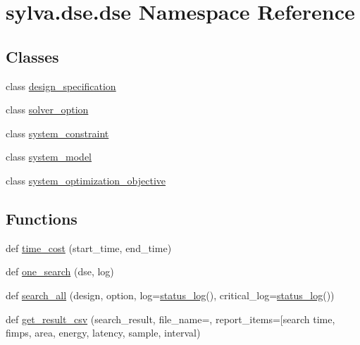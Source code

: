 \hypertarget{namespacesylva_1_1dse_1_1dse}{}\section{sylva.\+dse.\+dse Namespace Reference}
\label{namespacesylva_1_1dse_1_1dse}
\subsection*{Classes}
\begin{DoxyCompactItemize}
\item 
class \hyperlink{classsylva_1_1dse_1_1dse_1_1design__specification}{design\+\_\+specification}
\item 
class \hyperlink{classsylva_1_1dse_1_1dse_1_1solver__option}{solver\+\_\+option}
\item 
class \hyperlink{classsylva_1_1dse_1_1dse_1_1system__constraint}{system\+\_\+constraint}
\item 
class \hyperlink{classsylva_1_1dse_1_1dse_1_1system__model}{system\+\_\+model}
\item 
class \hyperlink{classsylva_1_1dse_1_1dse_1_1system__optimization__objective}{system\+\_\+optimization\+\_\+objective}
\end{DoxyCompactItemize}
\subsection*{Functions}
\begin{DoxyCompactItemize}
\item 
def \hyperlink{namespacesylva_1_1dse_1_1dse_acf83688e18cc0859483b4c9bb70183fd}{time\+\_\+cost} (start\+\_\+time, end\+\_\+time)
\item 
def \hyperlink{namespacesylva_1_1dse_1_1dse_a27653b05dda8ab9dab8aa948db5b860a}{one\+\_\+search} (dse, log)
\item 
def \hyperlink{namespacesylva_1_1dse_1_1dse_ab6e885c27f1c1dbe29468f3d931f1a63}{search\+\_\+all} (design, option, log=\hyperlink{classsylva_1_1misc_1_1util_1_1status__log}{status\+\_\+log}(), critical\+\_\+log=\hyperlink{classsylva_1_1misc_1_1util_1_1status__log}{status\+\_\+log}())
\item 
def \hyperlink{namespacesylva_1_1dse_1_1dse_ad3bf704cf280b975ad41bb205bfdc565}{get\+\_\+result\+\_\+csv} (search\+\_\+result, file\+\_\+name=\textquotesingle{}\textquotesingle{}, report\+\_\+items=\mbox{[}\textquotesingle{}search time\textquotesingle{}, fimps, area, energy, latency, sample, interval)
\end{DoxyCompactItemize}
